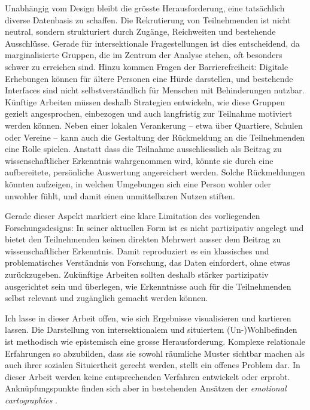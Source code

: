 Unabhängig vom Design bleibt die grösste Herausforderung, eine tatsächlich diverse Datenbasis zu schaffen. Die Rekrutierung von Teilnehmenden ist nicht neutral, sondern strukturiert durch Zugänge, Reichweiten und bestehende Ausschlüsse. Gerade für intersektionale Fragestellungen ist dies entscheidend, da marginalisierte Gruppen, die im Zentrum der Analyse stehen, oft besonders schwer zu erreichen sind. Hinzu kommen Fragen der Barrierefreiheit: Digitale Erhebungen können für ältere Personen eine Hürde darstellen, und bestehende Interfaces sind nicht selbstverständlich für Menschen mit Behinderungen nutzbar. Künftige Arbeiten müssen deshalb Strategien entwickeln, wie diese Gruppen gezielt angesprochen, einbezogen und auch langfristig zur Teilnahme motiviert werden können. Neben einer lokalen Verankerung -- etwa über Quartiere, Schulen oder Vereine -- kann auch die Gestaltung der Rückmeldung an die Teilnehmenden eine Rolle spielen. Anstatt dass die Teilnahme ausschliesslich als Beitrag zu wissenschaftlicher Erkenntnis wahrgenommen wird, könnte sie durch eine aufbereitete, persönliche Auswertung angereichert werden. Solche Rückmeldungen könnten aufzeigen, in welchen Umgebungen sich eine Person wohler oder unwohler fühlt, und damit einen unmittelbaren Nutzen stiften.

Gerade dieser Aspekt markiert eine klare Limitation des vorliegenden Forschungsdesigns: In seiner aktuellen Form ist es nicht partizipativ angelegt und bietet den Teilnehmenden keinen direkten Mehrwert ausser dem Beitrag zu wissenschaftlicher Erkenntnis. Damit reproduziert es ein klassisches und problematisches Verständnis von Forschung, das Daten einfordert, ohne etwas zurückzugeben. Zukünftige Arbeiten sollten deshalb stärker partizipativ ausgerichtet sein und überlegen, wie Erkenntnisse auch für die Teilnehmenden selbst relevant und zugänglich gemacht werden können.

Ich lasse in dieser Arbeit offen, wie sich Ergebnisse visualisieren und kartieren lassen. Die Darstellung von intersektionalem und situiertem (Un-)Wohlbefinden ist methodisch wie epistemisch eine grosse Herausforderung. Komplexe relationale Erfahrungen so abzubilden, dass sie sowohl räumliche Muster sichtbar machen als auch ihrer sozialen Situiertheit gerecht werden, stellt ein offenes Problem dar. In dieser Arbeit werden keine entsprechenden Verfahren entwickelt oder erprobt. Anknüpfungspunkte finden sich aber in bestehenden Ansätzen der \emph{emotional cartographies} \parencite[\gls{bspw}][]{bleischExploratoryGeovisualizationsSupporting2019}.

